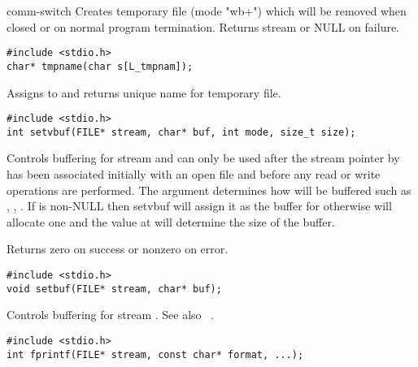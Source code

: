 \begin{Ventry2}{comm-switch  }
     Creates temporary file (mode "wb+") which will be removed when closed or
     on normal program termination. Returns stream or NULL on failure.

\item[tmpname]
\label{item:tmpname}
\begin{production}
\begin{verbatim}
#include <stdio.h>
char* tmpname(char s[L_tmpnam]);
\end{verbatim}
\end{production}

     Assigns to  and returns unique name for temporary file.

\item[setvbuf]
\label{item:setvbuf}
\begin{production}
\begin{verbatim}
#include <stdio.h>
int setvbuf(FILE* stream, char* buf, int mode, size_t size);
\end{verbatim}
\end{production}

     Controls buffering for stream  and can only be used
	after the stream pointer by  has been associated
	initially with an open file and before any read or write
	operations are performed. The argument  determines how
	 will be buffered such as , ,
	.  If  is non-NULL then setvbuf will assign
	it as the buffer for  otherwise  will
	allocate one and the value at  will determine the size
	of the buffer. 

	Returns zero on success or nonzero on error.


\item[setbuf]
\label{item:setbuf}
\begin{production}
\begin{verbatim}
#include <stdio.h>
void setbuf(FILE* stream, char* buf);
\end{verbatim}
\end{production}

     Controls buffering for stream . See also
	~\pageref{item:setvbuf}. 

\item[fprintf]
\label{item:fprintf}
\begin{production}
\begin{verbatim}
#include <stdio.h>
int fprintf(FILE* stream, const char* format, ...);
\end{verbatim}
\end{production}


\end{Ventry2}
